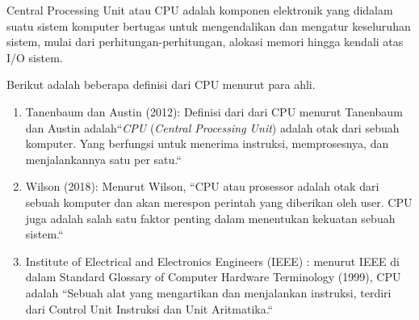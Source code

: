 Central Processing Unit atau CPU adalah komponen elektronik yang didalam suatu sistem komputer bertugas
untuk mengendalikan dan mengatur keseluruhan sistem, mulai dari perhitungan-perhitungan,
alokasi memori hingga kendali atas I/O sistem.

\begin{flushleft}
Berikut adalah beberapa definisi dari CPU menurut para ahli.
\end{flushleft}

\begin{enumerate}[label=(\arabic*)]
  \item Tanenbaum dan Austin (2012): Definisi dari dari CPU menurut Tanenbaum dan Austin adalah``\textit{CPU} (\textit{Central Processing Unit}) adalah otak dari sebuah komputer. Yang berfungsi untuk menerima instruksi, memprosesnya, dan menjalankannya satu per satu.``
  \item Wilson (2018): Menurut Wilson, ``CPU atau prosessor adalah otak dari sebuah komputer dan akan merespon perintah yang diberikan oleh user. CPU juga adalah salah satu faktor penting dalam menentukan kekuatan sebuah sistem.``
  \item Institute of Electrical and Electronics Engineers (IEEE) : menurut IEEE di dalam Standard Glossary of Computer Hardware Terminology (1999), CPU adalah ``Sebuah alat yang mengartikan dan menjalankan instruksi, terdiri dari Control Unit Instruksi dan Unit Aritmatika.``
\end{enumerate}
